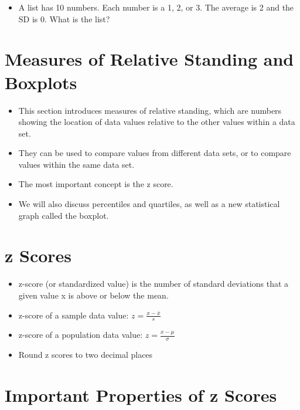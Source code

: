 \documentclass[]{book}
\providecommand{\tightlist}{%
  \setlength{\itemsep}{0pt}\setlength{\parskip}{0pt}}
\begin{document}
\begin{itemize}
\tightlist
\item
  A list has 10 numbers. Each number is a 1, 2, or 3. The average is 2 and the SD is 0. What is the list?
\end{itemize}

\hypertarget{measures-of-relative-standing-and-boxplots}{%
\section{Measures of Relative Standing and Boxplots}\label{measures-of-relative-standing-and-boxplots}}

\begin{itemize}
\tightlist
\item
  This section introduces measures of relative standing, which are numbers showing the location of data values relative to the other values within a data set.
\item
  They can be used to compare values from different data sets, or to compare values within the same data set.\\
\item
  The most important concept is the z score.
\item
  We will also discuss percentiles and quartiles, as well as a new statistical graph called the boxplot.
\end{itemize}

\hypertarget{z-scores}{%
\section{z Scores}\label{z-scores}}

\begin{itemize}
\tightlist
\item
  z-score (or standardized value) is the number of standard deviations that a given value x is above or below the mean.
\item
  z-score of a sample data value: \(z=\frac{x-\bar{x}}{s}\)
\item
  z-score of a population data value: \(z=\frac{x-\mu}{\sigma}\)
\item
  Round z scores to two decimal places
\end{itemize}

\hypertarget{important-properties-of-z-scores}{%
\section{Important Properties of z Scores}\label{important-properties-of-z-scores}}
\end{document}
